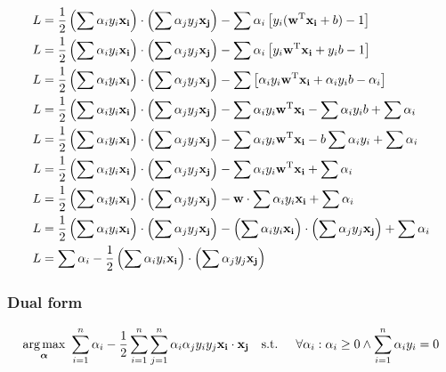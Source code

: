 \begin{align*}
    L &= \frac{1}{2} \left( \sum \alpha_i y_i \mathbf{x_i} \right) \cdot \left( \sum \alpha_j y_j \mathbf{x_j} \right)
    - \sum \alpha_i \left[ y_i (\mathbf{w}^{\text{T}} \mathbf{x_i} + b) - 1\right]
\\
    L &= \frac{1}{2} \left( \sum \alpha_i y_i \mathbf{x_i} \right) \cdot \left( \sum \alpha_j y_j \mathbf{x_j} \right)
    - \sum \alpha_i \left[ y_i \mathbf{w}^{\text{T}} \mathbf{x_i} + y_i b - 1\right]
\\
    L &= \frac{1}{2} \left( \sum \alpha_i y_i \mathbf{x_i} \right) \cdot \left( \sum \alpha_j y_j \mathbf{x_j} \right)
    - \sum \left[ \alpha_i y_i \mathbf{w}^{\text{T}} \mathbf{x_i} + \alpha_i y_i b - \alpha_i \right]
\\
    L &= \frac{1}{2} \left( \sum \alpha_i y_i \mathbf{x_i} \right) \cdot \left( \sum \alpha_j y_j \mathbf{x_j} \right)
    - \sum \alpha_i y_i \mathbf{w}^{\text{T}} \mathbf{x_i} - \sum \alpha_i y_i b + \sum \alpha_i
\\
    L &= \frac{1}{2} \left( \sum \alpha_i y_i \mathbf{x_i} \right) \cdot \left( \sum \alpha_j y_j \mathbf{x_j} \right)
    - \sum \alpha_i y_i \mathbf{w}^{\text{T}} \mathbf{x_i} - b \sum \alpha_i y_i + \sum \alpha_i 
\\
    L &= \frac{1}{2} \left( \sum \alpha_i y_i \mathbf{x_i} \right) \cdot \left( \sum \alpha_j y_j \mathbf{x_j} \right)
    - \sum \alpha_i y_i \mathbf{w}^{\text{T}} \mathbf{x_i} + \sum \alpha_i 
\\
    L &= \frac{1}{2} \left( \sum \alpha_i y_i \mathbf{x_i} \right) \cdot \left( \sum \alpha_j y_j \mathbf{x_j} \right)
    - \mathbf{w} \cdot \sum \alpha_i y_i \mathbf{x_i} + \sum \alpha_i 
\\
    L &= \frac{1}{2} \left( \sum \alpha_i y_i \mathbf{x_i} \right) \cdot \left( \sum \alpha_j y_j \mathbf{x_j} \right)
    - \left( \sum \alpha_i y_i \mathbf{x_i} \right) \cdot \left( \sum \alpha_j y_j \mathbf{x_j} \right) + \sum \alpha_i 
\\
    L &= \sum \alpha_i - \frac{1}{2} \left( \sum \alpha_i y_i \mathbf{x_i} \right) \cdot \left( \sum \alpha_j y_j \mathbf{x_j} \right)
\end{align*}

\subsubsection*{Dual form}
\begin{align}
    \underset{\boldsymbol{\alpha}}{\text{arg} \max}\ \sum_{i=1}^n \alpha_i - \frac{1}{2} \sum_{i=1}^n \sum_{j=1}^n \alpha_i \alpha_j y_i y_j \mathbf{x_i} \cdot \mathbf{x_j}
    \text{\quad s.t. \quad} \forall \alpha_i : \alpha_i \ge 0 \land \sum_{i=1}^n \alpha_i y_i = 0
\end{align}

